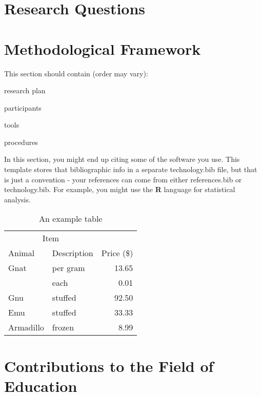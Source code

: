 \documentclass[
doc, %
biblatex, %
12pt,
draftfirst
]{apa6}
\begin{document}
\lipsum[2] %

\section{Research Questions}

\lipsum[3] %

\section{Methodological Framework}
This section should contain (order may vary):
\begin{APAitemize}
\item research plan
\item participants
\item tools
\item procedures
\end{APAitemize}

\noindent
In this section, you might end up citing some of the software you use. This template stores that bibliographic info in a separate technology.bib file, but that is just a convention - your references can come from either references.bib or technology.bib. For example, you might use the \textbf{R} language \parencite{rCore2017} for statistical analysis. 

\begin{table}[!htb]
\centering
\begin{tabularx}{0.39\textwidth}{@{}llr@{}} \toprule
\multicolumn{2}{c}{Item} \\ \cmidrule(r){1-2}
Animal & Description & Price (\$)\\ \midrule
Gnat & per gram & 13.65 \\
& each & 0.01 \\
Gnu & stuffed & 92.50 \\
Emu & stuffed & 33.33 \\
Armadillo & frozen & 8.99 \\ \bottomrule
\end{tabularx}
\vspace{1em}
\caption{An example table}
\label{table:example}
\end{table}




\section{Contributions to the Field of Education}
\lipsum[4] %

\linespread{1.1}
\printbibliography[title=References]
\end{document}
